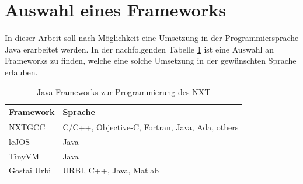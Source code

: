 \section{Auswahl eines Frameworks}

In dieser Arbeit soll nach M\"oglichkeit eine Umsetzung in der Programmiersprache Java erarbeitet werden. In der nachfolgenden Tabelle \ref{tab:NXT_Sprachen} ist eine Auswahl an Frameworks zu finden, welche eine solche Umsetzung in der gew\"unschten Sprache erlauben.
\par\smallskip
\begin{table}[H]
\label{tab:NXT_Sprachen}
\caption[Java Frameworks zur Programmierung des NXT]{ Java Frameworks zur Programmierung des NXT\footnotemark[23]}
\begin{tabular}{|p{5.7cm}|p{9cm}|}
\hline
\textbf{Framework} & \textbf{Sprache} \\
\hline
NXTGCC\footnotemark[24] & C/C++, Objective-C, Fortran, Java, Ada, others \\
\hline
leJOS\footnotemark[25] & Java \\
\hline
TinyVM\footnotemark[26] & Java \\
\hline
Gostai Urbi\footnotemark[27] & URBI, C++, Java, Matlab \\
\hline
\end{tabular}
\end{table}


\par\smallskip

